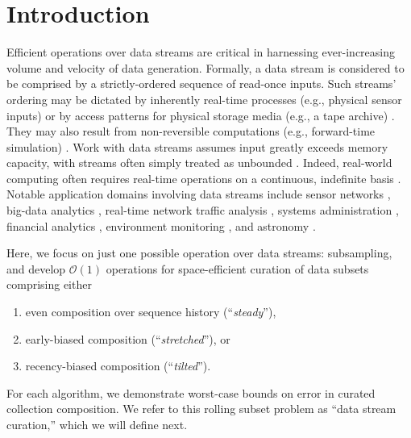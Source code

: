 \section{Introduction} \label{sec:introduction}

Efficient operations over data streams are critical in harnessing ever-increasing volume and velocity of data generation.
Formally, a data stream is considered to be comprised by a strictly-ordered sequence of read-once inputs.
Such streams' ordering may be dictated by inherently real-time processes (e.g., physical sensor inputs) or by access patterns for physical storage media (e.g., a tape archive) \citep{henzinger1998computing}.
They may also result from non-reversible computations (e.g., forward-time simulation) \citep{abdulla2004simulation,schutzel2014stream}.
Work with data streams assumes input greatly exceeds memory capacity, with streams often simply treated as unbounded \citep{jiang2006research}.
Indeed, real-world computing often requires real-time operations on a continuous, indefinite basis \citep{cordeiro2016online}.
Notable application domains involving data streams include sensor networks \citep{elnahrawy2003research}, big-data analytics \citep{he2010comet}, real-time network traffic analysis \citep{johnson2005streams,muthukrishnan2005data}, systems administration \citep{fischer2012real}, financial analytics \citep{rajeshwari2016real,agarwal2009faster}, environment monitoring \citep{hill2009real}, and astronomy \citep{graham2012data}.

Here, we focus on just one possible operation over data streams: subsampling, and develop $\mathcal{O}(1)$ operations for space-efficient curation of data subsets comprising either
\begin{enumerate}
\item even composition over sequence history (``\textit{steady}''),
\item early-biased composition (``\textit{stretched}''), or
\item recency-biased composition (``\textit{tilted}'').
\end{enumerate}
For each algorithm, we demonstrate worst-case bounds on error in curated collection composition.
We refer to this rolling subset problem as ``data stream curation,'' which we will define next.






